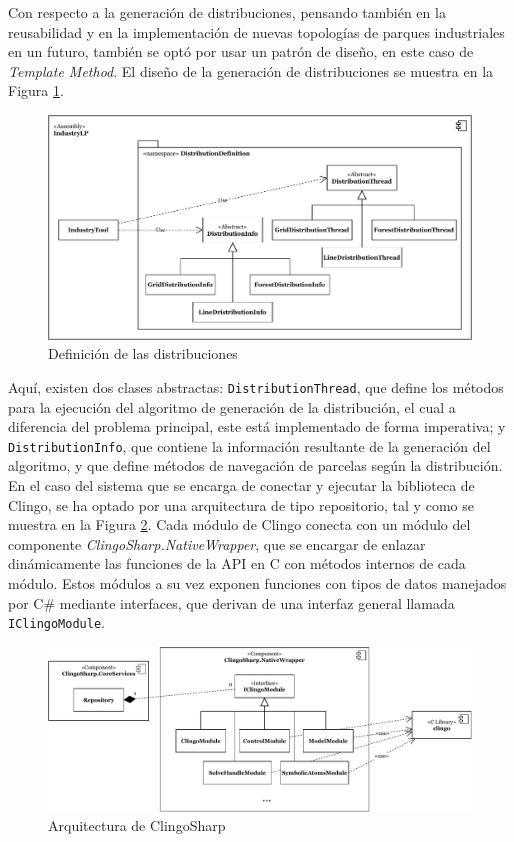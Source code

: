 \newpage

Con respecto a la generación de distribuciones, pensando también en la reusabilidad y en la implementación de nuevas topologías de parques industriales en un futuro, también se optó por usar un patrón de diseño, en este caso de \textit{Template Method}. El diseño de la generación de distribuciones se muestra en la Figura \ref{fig:distributions}.

\begin{figure}[!h]
	\centering
	\includegraphics[width=\textwidth]{images/distribuciones}
	\caption{Definición de las distribuciones}
	\label{fig:distributions}
\end{figure}

Aquí, existen dos clases abstractas: \texttt{DistributionThread}, que define los métodos para la ejecución del algoritmo de generación de la distribución, el cual a diferencia del problema principal, este está implementado de forma imperativa; y \texttt{DistributionInfo}, que contiene la información resultante de la generación del algoritmo, y que define métodos de navegación de parcelas según la distribución. \\

En el caso del sistema que se encarga de conectar y ejecutar la biblioteca de Clingo, se ha optado por una arquitectura de tipo repositorio, tal y como se muestra en la Figura \ref{fig:clingosharp-repository}. Cada módulo de Clingo conecta con un módulo del componente \textit{ClingoSharp.NativeWrapper}, que se encargar de enlazar dinámicamente las funciones de la API en C con métodos internos de cada módulo. Estos módulos a su vez exponen funciones con tipos de datos manejados por C\# mediante interfaces, que derivan de una interfaz general llamada \texttt{IClingoModule}. \\

\begin{figure}[!h]
	\centering
	\includegraphics[width=\textwidth]{images/repository}
	\caption{Arquitectura de ClingoSharp}
	\label{fig:clingosharp-repository}
\end{figure}

